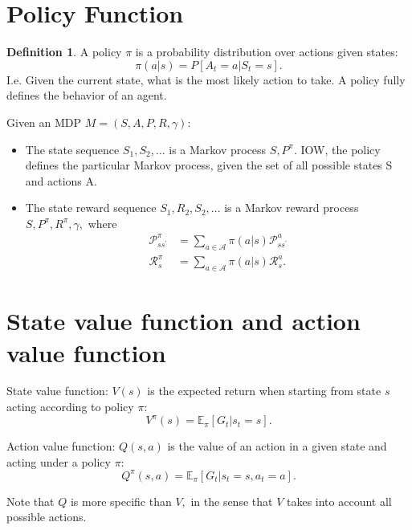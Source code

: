 \documentclass[12pt]{article}
\theoremstyle{plain}
\theoremstyle{definition}
\newtheorem{definition}[theorem]{Definition}
\theoremstyle{remark}
\begin{document}
\section{Policy Function}

\begin{definition}
  A policy \( \pi \) is a probability distribution over actions given states:
\[
  \pi(a|s) = P[A_t = a | S_t = s].
\]
I.e. Given the current state, what is the most likely action to take. A policy fully defines the behavior of an agent.
\end{definition}



Given an MDP \( M = (S, A, P, R, \gamma): \)

\begin{itemize}
\item The state sequence \( S_1, S_2, \ldots \) is a Markov process \( S, P^\pi. \) IOW, the policy defines the particular Markov process, given the set of all possible states S and actions A.

\item The state reward sequence \( S_1, R_2, S_2, \ldots \) is a Markov reward process \( S, P^\pi, R^\pi, \gamma, \)
where
\begin{align*}
\mathcal { P } _ { s s ^ { \prime } } ^ { \pi } &= \sum _ { a \in \mathcal { A } } \pi ( a | s ) \mathcal { P } _ { s s ^ { \prime } } ^ { a } \\
\mathcal { R } _ { s } ^ { \pi } &= \sum _ { a \in \mathcal { A } } \pi ( a | s ) \mathcal { R } _ { s } ^ { a }.
\end{align*}
\end{itemize}

\section{State value function and action value function}


State value function: \( V(s) \) is the expected return when starting from state \( s \) acting according to policy \( \pi: \)
\[
V ^ { \pi } ( s ) = \mathbb { E } _ { \pi } \left[ G _ { t } | s _ { t } = s \right].
\]

Action value function: \( Q(s, a) \) is the value of an action in a given state and acting under a policy \( \pi: \)
\[
Q ^ { \pi } ( s , a ) = \mathbb { E } _ { \pi } \left[ G _ { t } | s _ { t } = s , a _ { t } = a \right].
\]

Note that \( Q \) is more specific than \( V, \) in the sense that \( V \) takes into account all possible actions.
\end{document}
